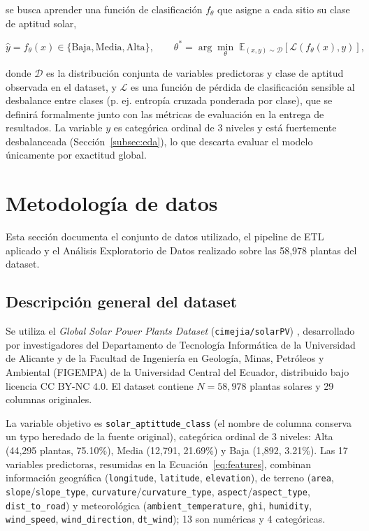 \documentclass[pdflatex,sn-mathphys-num]{sn-jnl}
\begin{document}
\noindent se busca aprender una función de clasificación $f_\theta$ que asigne a cada sitio su clase de aptitud solar,

\begin{equation}
\hat{y} = f_\theta(x) \in \{\text{Baja}, \text{Media}, \text{Alta}\}, \qquad \theta^* = \arg\min_{\theta} \; \mathbb{E}_{(x,y)\sim \mathcal{D}}\left[ \mathcal{L}(f_\theta(x), y) \right],
\label{eq:objetivo}
\end{equation}

\noindent donde $\mathcal{D}$ es la distribución conjunta de variables predictoras y clase de aptitud observada en el dataset, y $\mathcal{L}$ es una función de pérdida de clasificación sensible al desbalance entre clases (p. ej. entropía cruzada ponderada por clase), que se definirá formalmente junto con las métricas de evaluación en la entrega de resultados. La variable $y$ es categórica ordinal de 3 niveles y está fuertemente desbalanceada (Sección~\ref{subsec:eda}), lo que descarta evaluar el modelo únicamente por exactitud global.

\section{Metodología de datos}\label{sec:metodologia}

Esta sección documenta el conjunto de datos utilizado, el pipeline de ETL aplicado y el Análisis Exploratorio de Datos realizado sobre las 58{,}978 plantas del dataset.

\subsection{Descripción general del dataset}\label{subsec:datos}

Se utiliza el \textit{Global Solar Power Plants Dataset} (\texttt{cimejia/solarPV}) \cite{bib1}, desarrollado por investigadores del Departamento de Tecnología Informática de la Universidad de Alicante y de la Facultad de Ingeniería en Geología, Minas, Petróleos y Ambiental (FIGEMPA) de la Universidad Central del Ecuador, distribuido bajo licencia CC BY-NC 4.0. El dataset contiene $N = 58{,}978$ plantas solares y 29 columnas originales.

La variable objetivo es \texttt{solar\_aptittude\_class} (el nombre de columna conserva un typo heredado de la fuente original), categórica ordinal de 3 niveles: Alta (44{,}295 plantas, 75.10\%), Media (12{,}791, 21.69\%) y Baja (1{,}892, 3.21\%). Las 17 variables predictoras, resumidas en la Ecuación~\eqref{eq:features}, combinan información geográfica (\texttt{longitude}, \texttt{latitude}, \texttt{elevation}), de terreno (\texttt{area}, \texttt{slope}/\texttt{slope\_type}, \texttt{curvature}/\texttt{curvature\_type}, \texttt{aspect}/\texttt{aspect\_type}, \texttt{dist\_to\_road}) y meteorológica (\texttt{ambient\_temperature}, \texttt{ghi}, \texttt{humidity}, \texttt{wind\_speed}, \texttt{wind\_direction}, \texttt{dt\_wind}); 13 son numéricas y 4 categóricas.
\end{document}
